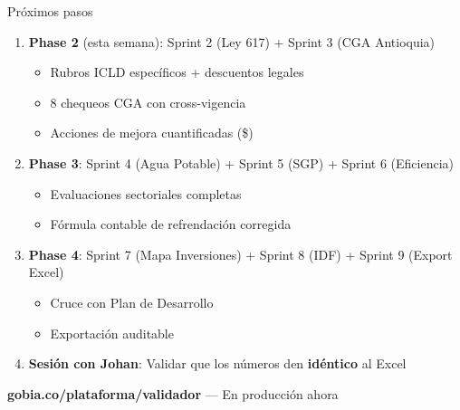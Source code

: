 \documentclass[aspectratio=169,12pt]{beamer}
\begin{document}
\begin{frame}{Pr\'oximos pasos}

\begin{enumerate}
    \item \textbf{Phase 2} (esta semana): Sprint 2 (Ley 617) + Sprint 3 (CGA Antioquia)
    \begin{itemize}
        \item Rubros ICLD espec\'ificos + descuentos legales
        \item 8 chequeos CGA con cross-vigencia
        \item Acciones de mejora cuantificadas (\$)
    \end{itemize}

    \vspace{6pt}
    \item \textbf{Phase 3}: Sprint 4 (Agua Potable) + Sprint 5 (SGP) + Sprint 6 (Eficiencia)
    \begin{itemize}
        \item Evaluaciones sectoriales completas
        \item F\'ormula contable de refrendaci\'on corregida
    \end{itemize}

    \vspace{6pt}
    \item \textbf{Phase 4}: Sprint 7 (Mapa Inversiones) + Sprint 8 (IDF) + Sprint 9 (Export Excel)
    \begin{itemize}
        \item Cruce con Plan de Desarrollo
        \item Exportaci\'on auditable
    \end{itemize}

    \vspace{6pt}
    \item \textbf{Sesi\'on con Johan}: Validar que los n\'umeros den \textbf{id\'entico} al Excel
\end{enumerate}

\vspace{8pt}
\centering
\textcolor{ochre}{\large\textbf{gobia.co/plataforma/validador} --- En producci\'on ahora}
\end{frame}
\end{document}

